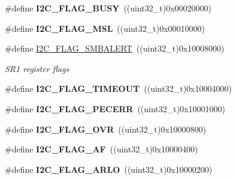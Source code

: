 \begin{DoxyCompactItemize}
\#define {\bfseries I2\+C\+\_\+\+F\+L\+A\+G\+\_\+\+B\+U\+SY}~((uint32\+\_\+t)0x00020000)
\item 
\mbox{\label{group___i2_c__flags__definition_gae8e6a404cbfd70420d278d520304f368}} 
\#define {\bfseries I2\+C\+\_\+\+F\+L\+A\+G\+\_\+\+M\+SL}~((uint32\+\_\+t)0x00010000)
\item 
\mbox{\label{group___i2_c__flags__definition_ga4e1d7cd1574d03ba501c27483300c1be}} 
\#define \mbox{\hyperlink{group___i2_c__flags__definition_ga4e1d7cd1574d03ba501c27483300c1be}{I2\+C\+\_\+\+F\+L\+A\+G\+\_\+\+S\+M\+B\+A\+L\+E\+RT}}~((uint32\+\_\+t)0x10008000)
\begin{DoxyCompactList}\small\item\em S\+R1 register flags ~\newline
 \end{DoxyCompactList}\item 
\mbox{\label{group___i2_c__flags__definition_ga89c8d5d8ccc77a8619fafe9b39d1cc74}} 
\#define {\bfseries I2\+C\+\_\+\+F\+L\+A\+G\+\_\+\+T\+I\+M\+E\+O\+UT}~((uint32\+\_\+t)0x10004000)
\item 
\mbox{\label{group___i2_c__flags__definition_ga6c7addb6413f165f42bcc87506ea8467}} 
\#define {\bfseries I2\+C\+\_\+\+F\+L\+A\+G\+\_\+\+P\+E\+C\+E\+RR}~((uint32\+\_\+t)0x10001000)
\item 
\mbox{\label{group___i2_c__flags__definition_gab579673c8ac920db199aa7f18e547fb3}} 
\#define {\bfseries I2\+C\+\_\+\+F\+L\+A\+G\+\_\+\+O\+VR}~((uint32\+\_\+t)0x10000800)
\item 
\mbox{\label{group___i2_c__flags__definition_ga2f89dbba9b964e6ade1480705e7a97d4}} 
\#define {\bfseries I2\+C\+\_\+\+F\+L\+A\+G\+\_\+\+AF}~((uint32\+\_\+t)0x10000400)
\item 
\mbox{\label{group___i2_c__flags__definition_gae1e67936f4780e42b8bbe04ac9c20a7b}} 
\#define {\bfseries I2\+C\+\_\+\+F\+L\+A\+G\+\_\+\+A\+R\+LO}~((uint32\+\_\+t)0x10000200)
\item 
\mbox{\label{group___i2_c__flags__definition_ga0454176b6ddd5c402abc3ef5953a21ad}} 

\end{DoxyCompactItemize}
